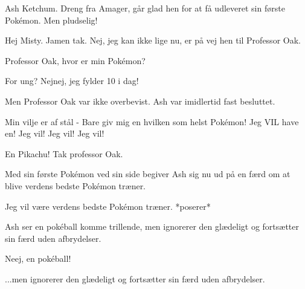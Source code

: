 \documentclass[a4paper,11pt]{article}
\begin{document}
\begin{sketch}

 Ash Ketchum. Dreng fra Amager, går glad hen for at få udleveret sin første Pokémon. Men pludselig!


 Hej Misty. Jamen tak. Nej, jeg kan ikke lige nu, er på vej hen til Professor Oak.


 Professor Oak, hvor er min Pokémon?


 For ung? Nejnej, jeg fylder 10 i dag!


 Men Professor Oak var ikke overbevist. Ash var imidlertid fast besluttet.

 Min vilje er af stål - Bare giv mig en hvilken som helst Pokémon! Jeg VIL have en! Jeg vil! Jeg vil! Jeg vil!


 En Pikachu! Tak professor Oak.

 Med sin første Pokémon ved sin side begiver Ash sig nu ud på en færd om at blive verdens bedste Pokémon træner.


 Jeg vil være verdens bedste Pokémon træner. *poserer*


 Ash ser en pokéball komme trillende, men ignorerer den glædeligt og fortsætter sin færd uden afbrydelser.

 Neej, en pokéball!

 ...men ignorerer den glædeligt og fortsætter sin færd uden afbrydelser.


\end{sketch}
\end{document}
